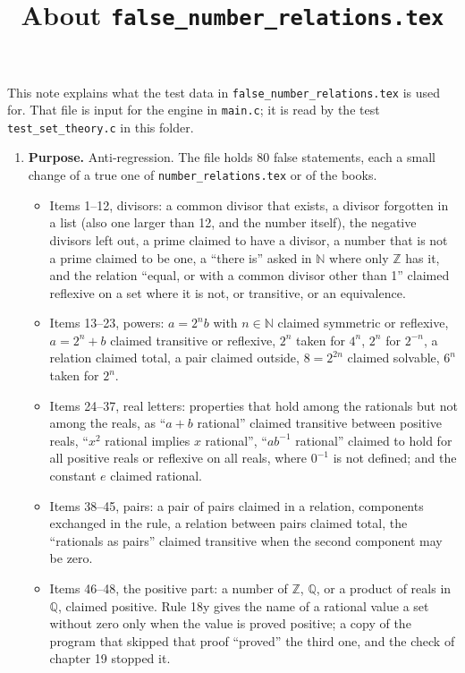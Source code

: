 \documentclass[11pt,a4paper]{article}
\title{About \texttt{false\_number\_relations.tex}}
\author{}
\date{}
\begin{document}
\maketitle
This note explains what the test data in \texttt{false\_number\_relations.tex} is used for. That file is input for the engine in \texttt{main.c}; it is read by the test \texttt{test\_set\_theory.c} in this folder.

\begin{enumerate}
\item \textbf{Purpose.} Anti-regression. The file holds 80 false statements, each a small change of a true one of \texttt{number\_relations.tex} or of the books.
\begin{itemize}
\item Items 1--12, divisors: a common divisor that exists, a divisor forgotten in a list (also one larger than 12, and the number itself), the negative divisors left out, a prime claimed to have a divisor, a number that is not a prime claimed to be one, a ``there is'' asked in $\mathbb{N}$ where only $\mathbb{Z}$ has it, and the relation ``equal, or with a common divisor other than 1'' claimed reflexive on a set where it is not, or transitive, or an equivalence.
\item Items 13--23, powers: $a = 2^{n} b$ with $n \in \mathbb{N}$ claimed symmetric or reflexive, $a = 2^{n} + b$ claimed transitive or reflexive, $2^{n}$ taken for $4^{n}$, $2^{n}$ for $2^{-n}$, a relation claimed total, a pair claimed outside, $8 = 2^{2n}$ claimed solvable, $6^{n}$ taken for $2^{n}$.
\item Items 24--37, real letters: properties that hold among the rationals but not among the reals, as ``$a + b$ rational'' claimed transitive between positive reals, ``$x^{2}$ rational implies $x$ rational'', ``$a b^{-1}$ rational'' claimed to hold for all positive reals or reflexive on all reals, where $0^{-1}$ is not defined; and the constant $e$ claimed rational.
\item Items 38--45, pairs: a pair of pairs claimed in a relation, components exchanged in the rule, a relation between pairs claimed total, the ``rationals as pairs'' claimed transitive when the second component may be zero.
\item Items 46--48, the positive part: a number of $\mathbb{Z}$, $\mathbb{Q}$, or a product of reals in $\mathbb{Q}$, claimed positive. Rule 18y gives the name of a rational value a set without zero only when the value is proved positive; a copy of the program that skipped that proof ``proved'' the third one, and the check of chapter 19 stopped it.

\end{itemize}
\end{enumerate}
\end{document}
